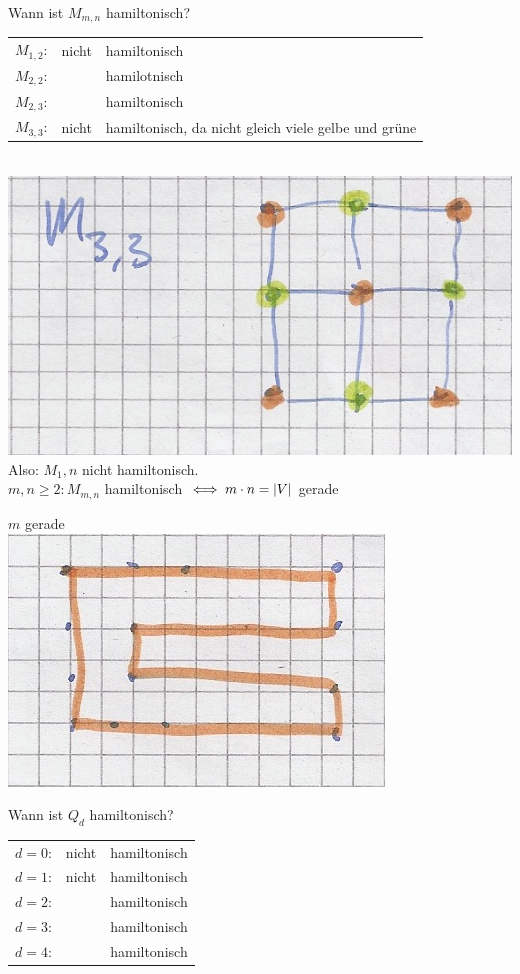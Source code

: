 Wann ist $M_{m,n}$ hamiltonisch?\\
\begin{tabular}{lll}
	$M_{1,2}$:	&nicht	&hamiltonisch	\\
	$M_{2,2}$:	&		&hamilotnisch	\\
	$M_{2,3}$:	&		&hamiltonisch	\\
	$M_{3,3}$:	&nicht	&hamiltonisch, da nicht gleich viele gelbe und grüne
\end{tabular}\\
\includegraphics{Bild52} \\
Also: $M_1,n$ nicht hamiltonisch. \\
$m,n \geq 2 : M_{m,n}$ hamiltonisch $\iff m \cdot n = \abs{V}$ gerade \\
\begin{bew}
	$m$ gerade\\
	\includegraphics{Bild53}
\end{bew}
Wann ist $Q_d$ hamiltonisch?\\
\begin{tabular}{lll}
	$d=0$:	&nicht	&hamiltonisch	\\
	$d=1$:	&nicht	&hamiltonisch	\\
	$d=2$:	&		&hamiltonisch	\\
	$d=3$:	&		&hamiltonisch	\\
	$d=4$:	&		&hamiltonisch	
\end{tabular}\\
